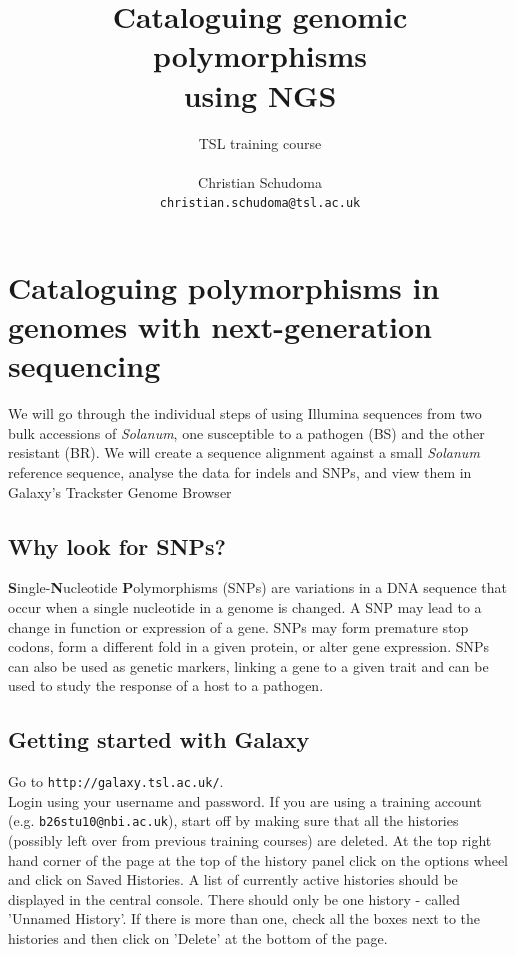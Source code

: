 \documentclass[12pt,a4paper]{article}
\title{\textbf{Cataloguing genomic polymorphisms \\ using NGS} }
\author{TSL training course \\\\ Christian Schudoma\\\texttt{christian.schudoma@tsl.ac.uk}}
\date{}                                           %
\begin{document}
	\maketitle
	\begin{center}
	\end{center}
	\pagebreak
	\tableofcontents
	\pagebreak
	


\section{Cataloguing polymorphisms in genomes with next-generation sequencing}

We will go through the individual steps of using Illumina sequences
from two bulk accessions of \emph{Solanum}, one susceptible to a
pathogen (BS) and the other resistant (BR). We will create a sequence
alignment against a small \emph{Solanum} reference sequence, analyse
the data for indels and SNPs, and view them in Galaxy's Trackster
Genome Browser

\subsection{Why look for SNPs?}

\textbf{S}ingle-\textbf{N}ucleotide \textbf{P}olymorphisms (SNPs) are
variations in a DNA sequence that occur when a single nucleotide in a
genome is changed. A SNP may lead to a change in function or
expression of a gene. SNPs may form premature stop codons, form a
different fold in a given protein, or alter gene expression. SNPs can
also be used as genetic markers, linking a gene to a given trait and
can be used to study the response of a host to a pathogen.

\subsection{Getting started with Galaxy}

Go to \texttt{http://galaxy.tsl.ac.uk/}.\\

Login using your username and password. If you are using a training
account (e.g. \texttt{b26stu10@nbi.ac.uk}), start off by making sure
that all the histories (possibly left over from previous training
courses) are deleted. At the top right hand corner of the page at the
top of the history panel click on the options wheel and click on Saved
Histories. A list of currently active histories should be displayed in
the central console. There should only be one history - called
'Unnamed History'. If there is more than one, check all the boxes next
to the histories and then click on 'Delete' at the bottom of the page.
\end{document}
